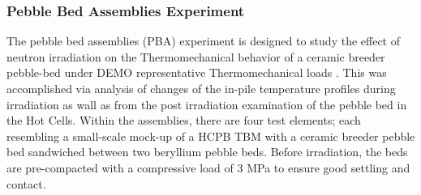 


\subsubsection{Pebble Bed Assemblies Experiment}
The pebble bed assemblies (PBA) experiment is designed to study the effect of neutron irradiation on the Thermomechanical behavior of a ceramic breeder pebble-bed under DEMO representative Thermomechanical loads \cite{Magielsen2007}. This was accomplished via analysis of changes of the in-pile temperature profiles during irradiation as wall as from the post irradiation examination of the pebble bed in the Hot Cells. Within the assemblies, there are four test elements; each resembling a small-scale mock-up of a HCPB TBM with a ceramic breeder pebble bed sandwiched between two beryllium pebble beds. Before irradiation, the beds are pre-compacted with a compressive load of 3 MPa to ensure good settling and contact.  


